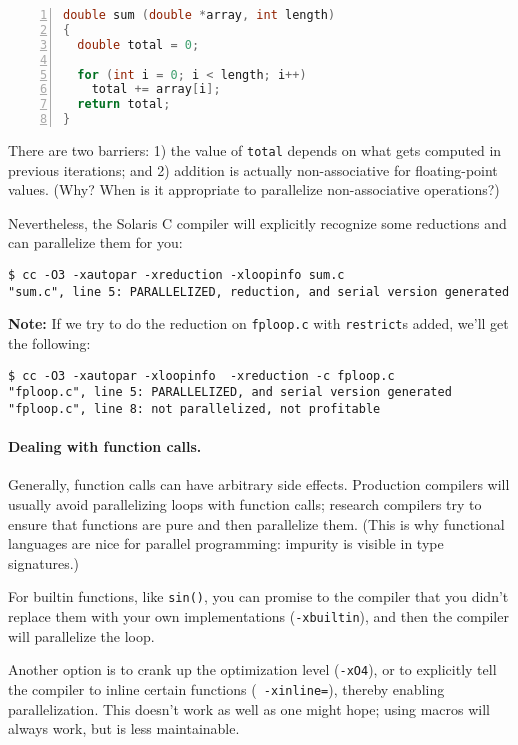 \documentclass[11pt]{article}
\begin{document}
{\tiny
\begin{lstlisting}[language=C,numbers=left]
double sum (double *array, int length)
{
  double total = 0;

  for (int i = 0; i < length; i++)
    total += array[i];
  return total;
}
\end{lstlisting}
}

There are two barriers: 1) the value of {\tt total} depends on what
gets computed in previous iterations; and 2) addition is actually
non-associative for floating-point values. ({\sf Why? When is it
appropriate to parallelize non-associative operations?})

Nevertheless, the Solaris C compiler will explicitly recognize
some reductions and can parallelize them for you:

{\small
\begin{verbatim}
$ cc -O3 -xautopar -xreduction -xloopinfo sum.c
"sum.c", line 5: PARALLELIZED, reduction, and serial version generated
\end{verbatim}
}

{\bf Note:}  If we try to do the reduction on {\tt fploop.c} with {\tt restrict}s added, we'll get the following:

\begin{lstlisting}
$ cc -O3 -xautopar -xloopinfo  -xreduction -c fploop.c
"fploop.c", line 5: PARALLELIZED, and serial version generated
"fploop.c", line 8: not parallelized, not profitable
\end{lstlisting}

\paragraph{Dealing with function calls.} Generally, function calls
can have arbitrary side effects. Production compilers will usually
avoid parallelizing loops with function calls; research compilers try
to ensure that functions are pure and then parallelize them.
(This is why functional languages are nice for parallel
programming: impurity is visible in type signatures.)

For builtin functions, like {\tt sin()}, you can promise to the 
compiler that you didn't replace them with your own implementations
({\tt -xbuiltin}), and then the compiler will parallelize the loop.

Another option is to crank up the optimization level ({\tt -xO4}), or
to explicitly tell the compiler to inline certain functions ({\tt
  -xinline=}), thereby enabling parallelization. This doesn't work as
well as one might hope; using macros will always work, but is less maintainable.
\end{document}
